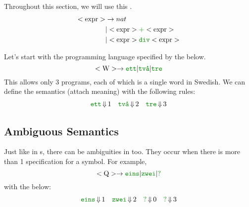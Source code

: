 \begin{blackbox}
  Throughout this section, we will use this  .
  \begin{equation}\label{eq:DivAdd_Grammar}
    \begin{aligned}
      \Nonterminal{expr} &\rightarrow nat \\
      &\vert \Nonterminal{expr} \textcolor{Green4}{\mathtt{+}} \Nonterminal{expr} \\
      &\vert \Nonterminal{expr} \textcolor{Green4}{\mathtt{div}} \Nonterminal{expr} \\
    \end{aligned}
  \end{equation}
\end{blackbox}

Let's start with the programming language specified by the  below.
\begin{equation*}
  \Nonterminal{W} \rightarrow \textcolor{Green4}{\mathtt{ett}} \vert \textcolor{Green4}{\text{\texttt{tv\r{a}}}} \vert \textcolor{Green4}{\mathtt{tre}}
\end{equation*}
This allows only 3 programs, each of which is a single word in Swedish.
We can define the semantics (attach meaning) with the following rules:
\begin{align*}
  \textcolor{Green4}{\mathtt{ett}} &\EvaluatesTo 1 & \textcolor{Green4}{\text{\texttt{tv\r{a}}}} &\EvaluatesTo 2 & \textcolor{Green4}{\mathtt{tre}} &\EvaluatesTo 3 \\
\end{align*}

\subsection{Ambiguous Semantics}\label{subsec:Ambiguous_Semantics}
Just like in s, there can be ambiguities in  too.
They occur when there is more than 1 specification for a symbol.
For example,
\begin{equation*}
  \Nonterminal{Q} \rightarrow \textcolor{Green4}{\mathtt{eins}} \vert \textcolor{Green4}{\mathtt{zwei}} \vert \textcolor{Green4}{\mathtt{?}}
\end{equation*}
with the  below:
\begin{align*}
  \textcolor{Green4}{\mathtt{eins}} &\EvaluatesTo 1 & \textcolor{Green4}{\mathtt{zwei}} &\EvaluatesTo 2 & \textcolor{Green4}{\mathtt{?}} &\EvaluatesTo 0 & \textcolor{Green4}{\mathtt{?}} &\EvaluatesTo 3 \\
\end{align*}

